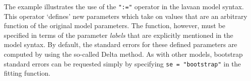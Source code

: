 The example illustrates the use of the \texttt{":="} operator in the
lavaan model syntax. This operator `defines' new parameters which take
on values that are an arbitrary function of the original model
parameters. The function, however, must be specified in terms of the
parameter \emph{labels} that are explicitly mentioned in the model
syntax. By default, the standard errors for these defined parameters are
computed by using the so-called Delta method. As with other models,
bootstrap standard errors can be requested simply by specifying
\texttt{se = "bootstrap"} in the fitting function.
